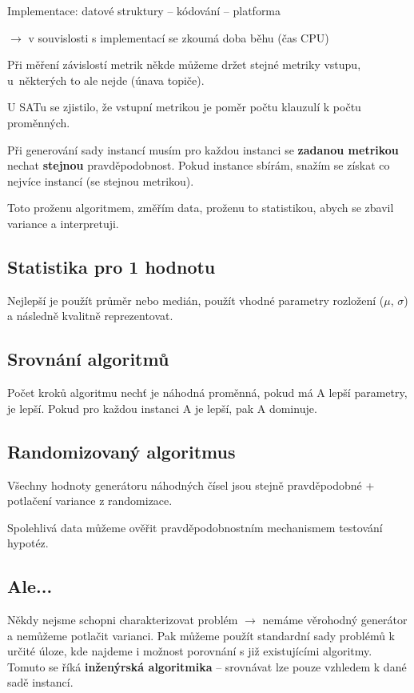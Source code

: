 \noindent Implementace: datové struktury -- kódování -- platforma

$\to$ v souvislosti s implementací se zkoumá doba běhu (čas CPU)

\vspace{4pt}

Při měření závislostí metrik někde můžeme držet stejné metriky vstupu, u~některých to ale nejde (únava topiče).

U SATu se zjistilo, že vstupní metrikou je poměr počtu klauzulí k počtu proměnných.

Při generování sady instancí musím pro každou instanci se \textbf{zadanou metri\-kou} nechat \textbf{stejnou} pravděpodobnost. Pokud instance sbírám, snažím se získat co nejvíce instancí (se stejnou metrikou).

Toto proženu algoritmem, změřím data, proženu to statistikou, abych se zbavil variance a interpretuji.

\subsection{Statistika pro 1 hodnotu}

Nejlepší je použít průměr nebo medián, použít vhodné parametry rozložení ($\mu$, $\sigma$) a následně kvalitně reprezentovat.

\subsection{Srovnání algoritmů}

Počet kroků algoritmu nechť je náhodná proměnná, pokud má A lepší parametry, je lepší. Pokud pro každou instanci A je lepší, pak A dominuje.

\subsection{Randomizovaný algoritmus}

Všechny hodnoty generátoru náhodných čísel jsou stejně pravděpodobné + potlačení variance z randomizace.

Spolehlivá data můžeme ověřit pravděpodobnostním mechanismem testování hypotéz.

\subsection*{Ale...}

Někdy nejsme schopni charakterizovat problém $\to$ nemáme věrohodný generátor a nemůžeme potlačit varianci. Pak můžeme použít standardní sady problémů k určité úloze, kde najdeme i možnost porovnání s již existujícími algoritmy. Tomuto se říká \textbf{inženýrská algoritmika} -- srovnávat lze pouze vzhledem k dané sadě instancí.

